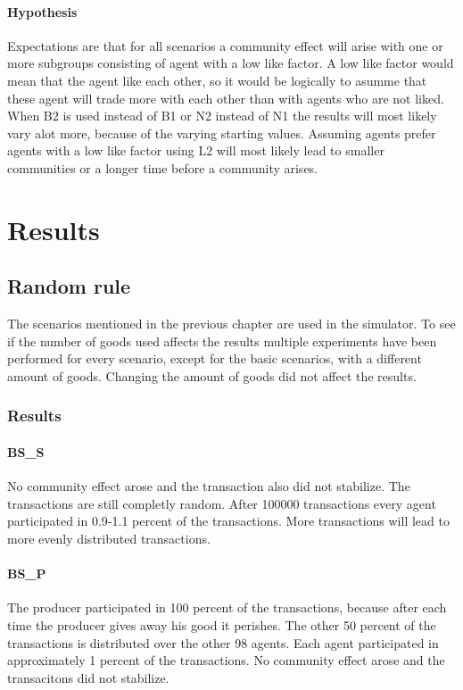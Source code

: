 \documentclass[twoside,openright]{uva-bachelor-thesis}
\begin{document}
\subsubsection{Hypothesis}
Expectations are that for all scenarios a community effect will arise with one or more subgroups consisting of agent with a low like factor. A low like factor would mean that the agent like each other, so it would be logically to asumme that these agent will trade more with each other than with agents who are not liked. When B2 is used instead of B1 or N2 instead of N1 the results will most likely vary alot more, because of the varying starting values. Assuming agents prefer agents with a low like factor using L2 will most likely lead to smaller communities or a longer time before a community arises.



\chapter{Results}

\section{Random rule}
The scenarios mentioned in the previous chapter are used in the simulator. To see if the number of goods used affects the results multiple experiments have been performed for every scenario, except for the basic scenarios, with a different amount of goods. Changing the amount of goods did not affect the results.
\subsection{Results}

\subsubsection{BS\_S}
No community effect arose and the transaction also did not stabilize. The transactions are still completly random. After 100000 transactions every agent participated in 0.9-1.1 percent of the transactions. More transactions will lead to more evenly distributed transactions.

\subsubsection{BS\_P}
The producer participated in 100 percent of the transactions, because after each time the producer gives away his good it perishes. The other 50 percent of the transactions is distributed over the other 98 agents. Each agent participated in approximately 1 percent of the transactions. No community effect arose and the transacitons did not stabilize.
\end{document}
